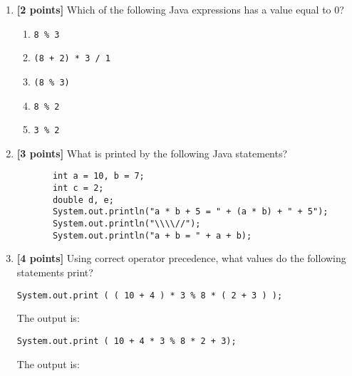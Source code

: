 \documentclass[11pt]{report}
\begin{document}
\begin{enumerate}
\bigskip

\item {\bf [2 points]}
Which of the following Java expressions has a value equal to 0?
\begin{enumerate}
  \item {\tt 8 \% 3}
  \item {\tt (8 + 2) * 3 / 1}
  \item {\tt (8 \% 3)}
  \item {\tt 8 \% 2}
  \item {\tt 3 \% 2}
\end{enumerate}

\bigskip


\item {\bf [3 points]}
What is printed by the following Java statements? 
\begin{verbatim}
       int a = 10, b = 7;
       int c = 2;
       double d, e;
       System.out.println("a * b + 5 = " + (a * b) + " + 5");
       System.out.println("\\\\//");
       System.out.println("a + b = " + a + b);
\end{verbatim}
\vspace{1.0in}

\newpage
\item {\bf [4 points]}
Using correct operator precedence, what values do the following statements print?

\begin{verbatim}
System.out.print ( ( 10 + 4 ) * 3 % 8 * ( 2 + 3 ) ); 		
\end{verbatim}

\vspace*{-.175in}
The output is: \mbox{\underline{\hspace{3in}}}

\begin{verbatim}
System.out.print ( 10 + 4 * 3 % 8 * 2 + 3);				    
\end{verbatim}	

\vspace*{-.175in}
The output is: \mbox{\underline{\hspace{3in}}}

\medskip



\end{enumerate}
\end{document}
